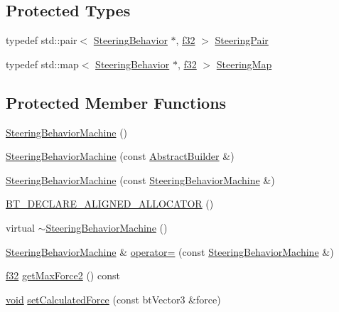 \subsection*{Protected Types}
\begin{DoxyCompactItemize}
\item 
typedef std\+::pair$<$ \mbox{\hyperlink{classnjli_1_1_steering_behavior}{Steering\+Behavior}} $\ast$, \mbox{\hyperlink{_util_8h_a5f6906312a689f27d70e9d086649d3fd}{f32}} $>$ \mbox{\hyperlink{classnjli_1_1_steering_behavior_machine_a1a02a6c877a13e3d51d91e0636cfff97}{Steering\+Pair}}
\item 
typedef std\+::map$<$ \mbox{\hyperlink{classnjli_1_1_steering_behavior}{Steering\+Behavior}} $\ast$, \mbox{\hyperlink{_util_8h_a5f6906312a689f27d70e9d086649d3fd}{f32}} $>$ \mbox{\hyperlink{classnjli_1_1_steering_behavior_machine_a4140175f3174e6e8d22e977a72220b5d}{Steering\+Map}}
\end{DoxyCompactItemize}
\subsection*{Protected Member Functions}
\begin{DoxyCompactItemize}
\item 
\mbox{\hyperlink{classnjli_1_1_steering_behavior_machine_a4ee69ac7ff9a845f31f488a94b3e4a95}{Steering\+Behavior\+Machine}} ()
\item 
\mbox{\hyperlink{classnjli_1_1_steering_behavior_machine_a9019174adb7e588dc03a3656fb546c21}{Steering\+Behavior\+Machine}} (const \mbox{\hyperlink{classnjli_1_1_abstract_builder}{Abstract\+Builder}} \&)
\item 
\mbox{\hyperlink{classnjli_1_1_steering_behavior_machine_ad55d19c8bdcc34048021f613b0503437}{Steering\+Behavior\+Machine}} (const \mbox{\hyperlink{classnjli_1_1_steering_behavior_machine}{Steering\+Behavior\+Machine}} \&)
\item 
\mbox{\hyperlink{classnjli_1_1_steering_behavior_machine_ae9872ddbb50d792d826fd85059f96507}{B\+T\+\_\+\+D\+E\+C\+L\+A\+R\+E\+\_\+\+A\+L\+I\+G\+N\+E\+D\+\_\+\+A\+L\+L\+O\+C\+A\+T\+OR}} ()
\item 
virtual \mbox{\hyperlink{classnjli_1_1_steering_behavior_machine_a95670a6b33019e1945dfd4425479a157}{$\sim$\+Steering\+Behavior\+Machine}} ()
\item 
\mbox{\hyperlink{classnjli_1_1_steering_behavior_machine}{Steering\+Behavior\+Machine}} \& \mbox{\hyperlink{classnjli_1_1_steering_behavior_machine_a666d87bb4e80a99fd5125102bf8f3064}{operator=}} (const \mbox{\hyperlink{classnjli_1_1_steering_behavior_machine}{Steering\+Behavior\+Machine}} \&)
\item 
\mbox{\hyperlink{_util_8h_a5f6906312a689f27d70e9d086649d3fd}{f32}} \mbox{\hyperlink{classnjli_1_1_steering_behavior_machine_acc1ec6529032eeb45aae2be40949304d}{get\+Max\+Force2}} () const
\item 
\mbox{\hyperlink{_thread_8h_af1e856da2e658414cb2456cb6f7ebc66}{void}} \mbox{\hyperlink{classnjli_1_1_steering_behavior_machine_ae8765d78cf8e8df73c72fdf9448d587e}{set\+Calculated\+Force}} (const bt\+Vector3 \&force)
\end{DoxyCompactItemize}
